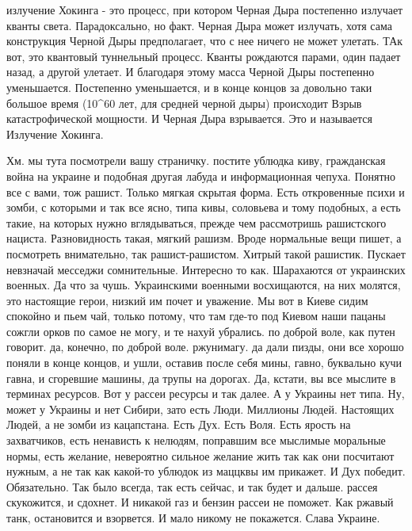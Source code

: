 излучение Хокинга - это процесс, при котором Черная Дыра постепенно излучает
кванты света. Парадоксально, но факт. Черная Дыра может излучать, хотя сама
конструкция Черной Дыры предполагает, что с нее ничего не может улетать. ТАк
вот, это квантовый туннельный процесс. Кванты рождаются парами, один падает
назад, а другой улетает. И благодаря этому масса Черной Дыры постепенно
уменьшается. Постепенно уменьшается, и в конце концов за довольно таки большое
время (10^60 лет, для средней черной дыры) происходит Взрыв катастрофической
мощности. И Черная Дыра взрывается. Это и называется Излучение Хокинга.


Хм. мы тута посмотрели вашу страничку. постите ублюдка киву, гражданская война
на украине и подобная другая лабуда и информационная чепуха. Понятно все с
вами, тож рашист. Только мягкая скрытая форма. Есть откровенные психи и зомби,
с которыми и так все ясно, типа кивы, соловьева и тому подобных, а есть такие,
на которых нужно вглядываться, прежде чем рассмотришь рашистского нациста.
Разновидность такая, мягкий рашизм. Вроде нормальные вещи пишет, а посмотреть
внимательно, так рашист-рашистом. Хитрый такой рашистик. Пускает невзначай
месседжи сомнительные. Интересно то как. Шарахаются от украинских военных. Да
что за чушь. Украинскими военными восхищаются, на них молятся, это настоящие
герои, низкий им почет и уважение. Мы вот в Киеве сидим спокойно и пьем чай,
только потому, что там где-то под Киевом наши пацаны сожгли орков по самое не
могу, и те нахуй убрались. по доброй воле, как путен говорит. да, конечно, по
доброй воле. ржунимагу. да дали пизды, они все хорошо поняли в конце концов, и
ушли, оставив после себя мины, гавно, буквально кучи гавна, и сгоревшие машины,
да трупы на дорогах. Да, кстати, вы все мыслите в терминах ресурсов. Вот у
рассеи ресурсы и так далее. А у Украины нет типа. Ну, может у Украины и нет
Сибири, зато есть Люди. Миллионы Людей. Настоящих Людей, а не зомби из
кацапстана. Есть Дух. Есть Воля. Есть ярость на захватчиков, есть ненависть к
нелюдям, поправшим все мыслимые моральные нормы, есть желание, невероятно
сильное желание жить так как они посчитают нужным, а не так как какой-то
ублюдок из маццквы им прикажет.  И Дух победит. Обязательно. Так было всегда,
так есть сейчас, и так будет и дальше. рассея скукожится, и сдохнет. И никакой
газ и бензин рассеи не поможет.  Как ржавый танк, остановится и взорвется. И
мало никому не покажется. Слава Украине.

